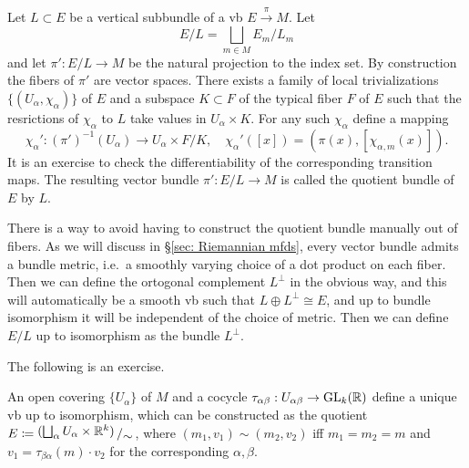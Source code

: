 \begin{defn}
    Let $L\subset E$ be a vertical subbundle of a \gls{vb} $E\overset{\pi}{\to}M$. Let
    \[E\slash L=\bigsqcup_{m\in M}E_m\slash L_m\]
    and let $\pi':E\slash L\to M$ be the natural projection to the index set. By construction the fibers of $\pi'$ are vector spaces. There exists a family of local trivializations $\{(U_\alpha,\chi_\alpha)\}$ of $E$ and a subspace $K\subset F$ of the typical fiber $F$ of $E$ such that the resrictions of $\chi_\alpha$ to $L$ take values in $U_\alpha\times K$. For any such $\chi_\alpha$ define a mapping
    \[\chi_\alpha':(\pi')^{-1}(U_\alpha)\to U_\alpha\times F\slash K,\quad \chi_\alpha'([x])=(\pi(x),[\chi_{\alpha,m}(x)]).\]
    It is an exercise to check the differentiability of the corresponding transition maps. The resulting vector bundle $\pi':E\slash L\to M$ is called the quotient bundle of $E$ by $L$.
\end{defn}
\begin{rem}
    There is a way to avoid having to construct the quotient bundle manually out of fibers. As we will discuss in \S\ref{sec: Riemannian mfds}, every vector bundle admits a bundle metric, i.e.~a smoothly varying choice of a dot product on each fiber. Then we can define the ortogonal complement $L^\perp$ in the obvious way, and this will automatically be a smooth \gls{vb} such that $L\oplus L^\perp\cong E$, and up to bundle isomorphism it will be independent of the choice of metric. Then we can define $E\slash L$ up to isomorphism as the bundle $L^\perp$.
\end{rem}


The following is an exercise.
\begin{prop}
    An open covering $\{U_\alpha\}$ of $M$ and a cocycle $\tau_{\alpha\beta}:U_{\alpha\beta}\to\operatorname{GL}_k (\mathbb{R} )$ define a unique \gls{vb} up to isomorphism, which can be constructed as the quotient $E\coloneqq \bigslant{(\bigsqcup_\alpha U_\alpha \times \bbR^k)}{\sim}$, where $(m_1,v_1)\sim(m_2,v_2)$ iff $m_1=m_2=m$ and $v_1=\tau_{\beta\alpha}(m)\cdot v_2$ for the corresponding $\alpha,\beta$.
\end{prop}




